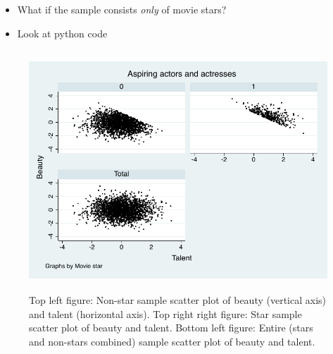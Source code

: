 \documentclass{beamer}
\begin{document}
\begin{frame}[plain]

  \begin{itemize}
    \item What if the sample consists \emph{only} of movie stars?
    \item Look at python code
  \end{itemize}

  \begin{center}
  \end{center}




\end{frame}

\begin{frame}[shrink=20,plain]

  \begin{figure}
    \includegraphics[height=9cm]{./lecture_includes/beauty_collider.pdf}
    \caption{Top left figure: Non-star sample scatter plot of beauty (vertical axis) and talent (horizontal axis). Top right right figure: Star sample scatter plot of beauty and talent.  Bottom left figure: Entire (stars and non-stars combined) sample scatter plot of beauty and talent.}
  \end{figure}
\end{frame}
\end{document}
